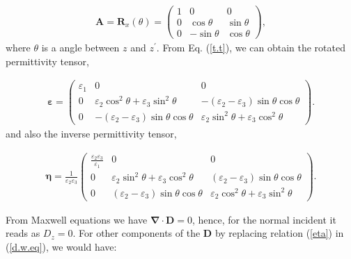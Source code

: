 \documentclass[9pt,twocolumn,twoside]{osajnl}
\begin{document}
\begin{align}\label{r.m}
        \mathbf{A}=\mathbf{R}_{x}(\theta)=
        \begin{pmatrix}
            1&0&0 \\
            0&\cos{\theta} &\sin{\theta} \\
            0&-\sin{\theta} & \cos{\theta}
        \end{pmatrix},
\end{align}
where $\theta$ is a angle between $z$ and $z^{\prime}$.  From Eq. (\ref{t.t}),  we can obtain the rotated permittivity tensor,

\begin{align}\label{eps}
        \boldsymbol{\varepsilon}=
        \begin{pmatrix}
             \varepsilon_{1} &0 &0 \\
            0&\varepsilon_{2} \cos^{2}{\theta} + \varepsilon_{3}\sin^{2}{\theta}   &-(\varepsilon_{2}-\varepsilon_{3})\sin{\theta}\cos{\theta} \\
            0&-(\varepsilon_{2}-\varepsilon_{3})\sin{\theta}\cos{\theta} &\varepsilon_{2} \sin^{2}{\theta} + \varepsilon_{3}\cos^{2}{\theta}
        \end{pmatrix}.
\end{align}
and also the inverse permittivity tensor,

\begin{align}\label{eta}
        \boldsymbol{\eta}= \frac{1}{\varepsilon_{2} \varepsilon_{3}}
        \begin{pmatrix}
            \frac{\varepsilon_{2} \varepsilon_{3}}{\varepsilon_{1}}& 0  &0 \\
            0&\varepsilon_{2} \sin^{2}{\theta} + \varepsilon_{3}\cos^{2}{\theta}   & (\varepsilon_{2}-\varepsilon_{3})\sin{ \theta} \cos {\theta} \\
            0& (\varepsilon_{2}-\varepsilon_{3})\sin{\theta}\cos{\theta} &\varepsilon_{2} \cos^{2}{\theta} + \varepsilon_{3}\sin^{2}{\theta}
        \end{pmatrix}.
\end{align}

From Maxwell equations we have $\boldsymbol{\nabla}\cdot \mathbf{D}=0$, hence, for  the normal incident it reads as ${D}_{z}=0$.  
For other components of the $\mathbf{D}$ by replacing relation (\ref{eta}) in (\ref{d.w.eq}), we would have:
\end{document}
